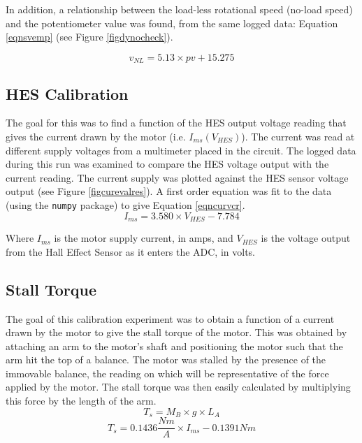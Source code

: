 \documentclass[twoside,a4]{report}
\begin{document}
	\noindent
	In addition, a relationship between the load-less rotational speed (no-load speed) and the potentiometer value was found, from the same logged data: Equation \ref{eqnsvemp} (see Figure \ref{figdynocheck}).
	
	\begin{equation}
		v_{NL} = 5.13 \times pv + 15.275
		\label{eqnsvemp}
	\end{equation}
	
	
	\subsection*{HES Calibration}
	The goal for this was to find a function of the HES output voltage reading that gives the current drawn by the motor (i.e. \(I_{ms} ({V_{HES}})\)). The current was read at different supply voltages from a multimeter placed in the circuit. The logged data during this run was examined to compare the HES voltage output with the current reading. The current supply was plotted against the HES sensor voltage output (see Figure \ref{figcurevalres}). A first order equation was fit to the data (using the \texttt{numpy} package) to give Equation \ref{eqncurvcr}.
	\begin{equation}
		I_{ms} = 3.580 \times {V_{HES}} - 7.784
		\label{eqncurvcr}
	\end{equation}
	
	
	\noindent
	Where \(I_{ms}\) is the motor supply current, in amps, and \(V_{HES}\) is the voltage output from the Hall Effect Sensor as it enters the ADC, in volts.
	
	\subsection*{Stall Torque}
	The goal of this calibration experiment was to obtain a function of a current drawn by the motor to give the stall torque of the motor. This was obtained by attaching an arm to the motor's shaft and positioning the motor such that the arm hit the top of a balance. The motor was stalled by the presence of the immovable balance, the reading on which will be representative of the force applied by the motor. The stall torque was then easily calculated by multiplying this force by the length of the arm.
	\begin{equation}
		T_s = M_B \times g \times L_A
		\label{eqntscalc}
	\end{equation}
	\begin{equation}
		T_s = 0.1436 \frac{Nm}{A} \times I_{ms} - 0.1391 Nm
		\label{eqntsemp}
	\end{equation}
	
\end{document}
